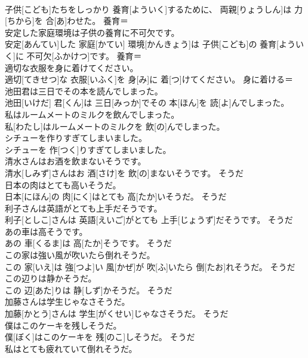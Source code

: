 \documentclass[8pt]{extreport}
\begin{document}
\begin{CJK}{UTF8}{min}
\\	子供[こども]たちをしっかり 養育[よういく]するために、 両親[りょうしん]は 力[ちから]を 合[あ]わせた。	養育＝ 
\\	安定した家庭環境は子供の養育に不可欠です。	
\\	安定[あんてい]した 家庭[かてい] 環境[かんきょう]は 子供[こども]の 養育[よういく]に 不可欠[ふかけつ]です。	養育＝ 
\\	適切な衣服を身に着けてください。	
\\	適切[てきせつ]な 衣服[いふく]を 身[み]に 着[つ]けてください。	身に着ける＝ 
\\	池田君は三日でその本を読んでしまった。	
\\	池田[いけだ] 君[くん]は 三日[みっか]でその 本[ほん]を 読[よ]んでしまった。	
\\	私はルームメートのミルクを飲んでしまった。	
\\	私[わたし]はルームメートのミルクを 飲[の]んでしまった。	
\\	シチューを作りすぎてしまいました。	
\\	シチューを 作[つく]りすぎてしまいました。	
\\	清水さんはお酒を飲まないそうです。	
\\	清水[しみず]さんはお 酒[さけ]を 飲[の]まないそうです。	そうだ 
\\	日本の肉はとても高いそうだ。	
\\	日本[にほん]の 肉[にく]はとても 高[たか]いそうだ。	そうだ 
\\	利子さんは英語がとても上手だそうです。	
\\	利子[としこ]さんは 英語[えいご]がとても 上手[じょうず]だそうです。	そうだ 
\\	あの車は高そうです。	
\\	あの 車[くるま]は 高[たか]そうです。	そうだ 
\\	この家は強い風が吹いたら倒れそうだ。	
\\	この 家[いえ]は 強[つよ]い 風[かぜ]が 吹[ふ]いたら 倒[たお]れそうだ。	そうだ 
\\	この辺りは静かそうだ。	
\\	この 辺[あた]りは 静[しず]かそうだ。	そうだ 
\\	加藤さんは学生じゃなさそうだ。	
\\	加藤[かとう]さんは 学生[がくせい]じゃなさそうだ。	そうだ 
\\	僕はこのケーキを残しそうだ。	
\\	僕[ぼく]はこのケーキを 残[のこ]しそうだ。	そうだ 
\\	私はとても疲れていて倒れそうだ。	

\end{CJK}
\end{document}
